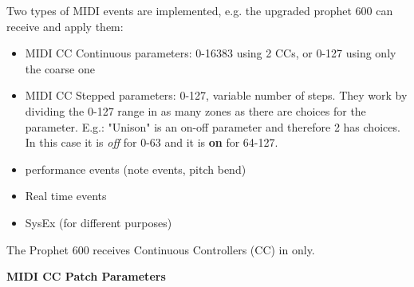 Two types of MIDI events are implemented, e.g. the upgraded prophet 600 can receive and apply them:

\begin{itemize}
  \setlength\itemsep{0cm}
  \item MIDI CC Continuous parameters: 0-16383 using 2 CCs, or 0-127 using only the coarse one
  \item MIDI CC Stepped parameters: 0-127, variable number of steps. They work by dividing the 0-127 range in as many zones as there are choices for the parameter. E.g.: "Unison" is an on-off parameter and therefore 2 has choices. In this case it is \textit{off} for 0-63 and it is \textbf{on} for 64-127.
  \item performance events (note events, pitch bend)
  \item Real time events
  \item SysEx (for different purposes)
\end{itemize}

The Prophet 600 receives Continuous Controllers (CC) in \presetmode only. 

\textbf{MIDI CC Patch Parameters} 

\footnotesize
\renewcommand{\arraystretch}{1.3}

